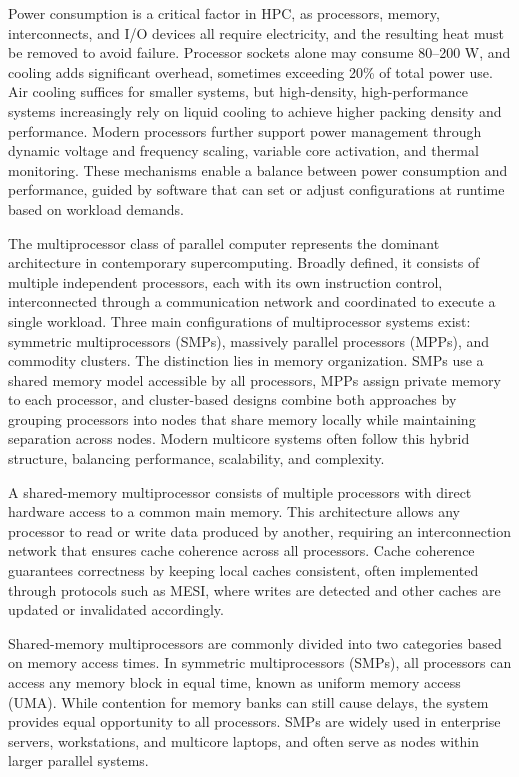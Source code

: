 Power consumption is a critical factor in HPC, as processors, memory, interconnects, and I/O devices all require electricity, and the resulting heat must be removed to avoid failure. Processor sockets alone may consume 80–200 W, and cooling adds significant overhead, sometimes exceeding 20\% of total power use. Air cooling suffices for smaller systems, but high-density, high-performance systems increasingly rely on liquid cooling to achieve higher packing density and performance. Modern processors further support power management through dynamic voltage and frequency scaling, variable core activation, and thermal monitoring. These mechanisms enable a balance between power consumption and performance, guided by software that can set or adjust configurations at runtime based on workload demands.

The multiprocessor class of parallel computer represents the dominant architecture in contemporary supercomputing. Broadly defined, it consists of multiple independent processors, each with its own instruction control, interconnected through a communication network and coordinated to execute a single workload. Three main configurations of multiprocessor systems exist: symmetric multiprocessors (SMPs), massively parallel processors (MPPs), and commodity clusters. The distinction lies in memory organization. SMPs use a shared memory model accessible by all processors, MPPs assign private memory to each processor, and cluster-based designs combine both approaches by grouping processors into nodes that share memory locally while maintaining separation across nodes. Modern multicore systems often follow this hybrid structure, balancing performance, scalability, and complexity.

A shared-memory multiprocessor consists of multiple processors with direct hardware access to a common main memory. This architecture allows any processor to read or write data produced by another, requiring an interconnection network that ensures cache coherence across all processors. Cache coherence guarantees correctness by keeping local caches consistent, often implemented through protocols such as MESI, where writes are detected and other caches are updated or invalidated accordingly.

Shared-memory multiprocessors are commonly divided into two categories based on memory access times. In symmetric multiprocessors (SMPs), all processors can access any memory block in equal time, known as uniform memory access (UMA). While contention for memory banks can still cause delays, the system provides equal opportunity to all processors. SMPs are widely used in enterprise servers, workstations, and multicore laptops, and often serve as nodes within larger parallel systems.

